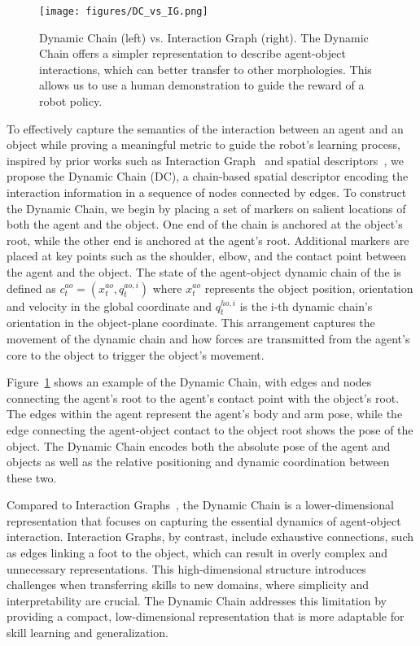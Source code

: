 \begin{figure}[t]
 \centering
\texttt{[image: figures/DC\_vs\_IG.png]}
 \vspace{-.5em}
\caption{Dynamic Chain (left) vs. Interaction Graph (right). The Dynamic Chain offers a simpler representation to describe agent-object interactions, which can better transfer to other morphologies. This allows us to use a human demonstration to guide the reward of a robot policy.  
}
\label{fig:DC_vs_IG}
 \vspace{-0.2cm}
\end{figure}


To effectively capture the semantics of the interaction between an agent and an object while proving a meaningful metric to guide the robot's learning process, inspired by prior works such as Interaction Graph~\citep{InteractionGraph} and spatial descriptors~\cite{ho2010spatial}, we propose the Dynamic Chain (DC), a chain-based spatial descriptor encoding the interaction information in a sequence of nodes connected by edges. To construct the Dynamic Chain, we begin by placing a set of markers on salient locations of both the agent and the object. One end of the chain is anchored at the object’s root, while the other end is anchored at the agent’s root. Additional markers are placed at key points such as the shoulder, elbow, and the contact point between the agent and the object. The state of the agent-object dynamic chain of the is defined as $c^{ao}_t = (x^{ao}_t, q^{ao,i}_t)$ where $x^{ao}_t$ represents the object position, orientation and velocity in the global coordinate and $q^{ho,i}_t$ is the i-th dynamic chain's orientation in the object-plane coordinate. This arrangement captures the movement of the dynamic chain and how forces are transmitted from the agent's core to the object to trigger the object's movement.





Figure~\ref{fig:DC_vs_IG} shows an example of the Dynamic Chain, with edges and nodes connecting the agent's root to the agent's contact point with the object's root. The edges within the agent represent the agent's body and arm pose, while the edge connecting the agent-object contact to the object root shows the pose of the object. The Dynamic Chain encodes both the absolute pose of the agent and objects as well as the relative positioning and dynamic coordination between these two.


Compared to Interaction Graphs~\cite{InteractionGraph}, the Dynamic Chain is a lower-dimensional representation that focuses on capturing the essential dynamics of agent-object interaction. Interaction Graphs, by contrast, include exhaustive connections, such as edges linking a foot to the object, which can result in overly complex and unnecessary representations. This high-dimensional structure introduces challenges when transferring skills to new domains, where simplicity and interpretability are crucial. The Dynamic Chain addresses this limitation by providing a compact, low-dimensional representation that is more adaptable for skill learning and generalization.




